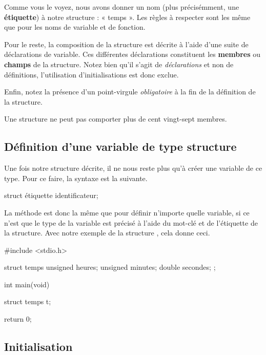 Comme vous le voyez, nous avons donner un nom (plus précisémment, une
\textbf{étiquette}) à notre structure : « temps ». Les règles à
respecter sont les même que pour les noms de variable et de fonction.

Pour le reste, la composition de la structure est décrite à l'aide d'une
suite de déclarations de variable. Ces différentes déclarations
constituent les \textbf{membres} ou \textbf{champs} de la structure.
Notez bien qu'il s'agit de \emph{déclarations} et non de définitions,
l'utilisation d'initialisations est donc exclue.

Enfin, notez la présence d'un point-virgule \emph{obligatoire} à la fin
de la définition de la structure.

\begin{infobox}
Une structure ne peut pas comporter plus de cent vingt-sept membres. 
\end{infobox}


\subsection{Définition d'une variable de type structure}
\label{definition-dune-variable-de-type-structure}

Une fois notre structure décrite, il ne nous reste plus qu'à créer une
variable de ce type. Pour ce faire, la syntaxe est la suivante.

\begin{C}
struct étiquette identificateur;
\end{C}

La méthode est donc la même que pour définir n'importe quelle variable,
si ce n'est que le type de la variable est précisé à l'aide du mot-clé
 et de l'étiquette de la structure. Avec notre exemple de
la structure , cela donne ceci.

\begin{C}
#include <stdio.h>

struct temps {
    unsigned heures;
    unsigned minutes;
    double secondes;
};


int main(void)
{
    struct temps t;

    return 0;
}
\end{C}

\subsection{Initialisation}
\label{initialisation-3}

